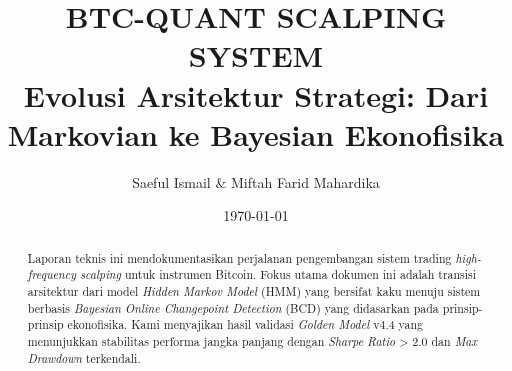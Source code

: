 \documentclass[a4paper,11pt]{article}
\title{
    \textbf{\huge BTC-QUANT SCALPING SYSTEM}\\
    \large Evolusi Arsitektur Strategi: Dari Markovian ke Bayesian Ekonofisika
}
\author{Saeful Ismail \& Miftah Farid Mahardika}
\date{\today}
\begin{document}
\maketitle

\begin{abstract}
Laporan teknis ini mendokumentasikan perjalanan pengembangan sistem trading \textit{high-frequency scalping} untuk instrumen Bitcoin. Fokus utama dokumen ini adalah transisi arsitektur dari model \textit{Hidden Markov Model} (HMM) yang bersifat kaku menuju sistem berbasis \textit{Bayesian Online Changepoint Detection} (BCD) yang didasarkan pada prinsip-prinsip ekonofisika. Kami menyajikan hasil validasi \textit{Golden Model} v4.4 yang menunjukkan stabilitas performa jangka panjang dengan \textit{Sharpe Ratio} > 2.0 dan \textit{Max Drawdown} terkendali.
\end{abstract}

\tableofcontents
\newpage










\end{document}
